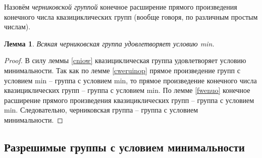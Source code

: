 \documentclass{article}
\newtheorem{lemma}{Лемма}[section]
\begin{document}
Назовём \textit{черниковской группой} конечное расширение прямого произведения конечного числа квазициклических групп (вообще говоря, по различным простым числам).

\begin{lemma}
    Всякая черниковская группа удовлетворяет условию min.
\end{lemma}
\begin{proof}
    В силу леммы \ref{cniow} квазициклическая группа удовлетворяет условию минимальности. Так как по лемме \ref{cweruinop} прямое произведение групп с условием min -- группа с условием min, то прямое произведение конечного числа квазициклических групп -- группа с условием min.
    По лемме \ref{fwenuo} конечное расширение прямого произведения квазициклических групп -- группа с условием min.
    Следовательно, черниковская группа -- группа с условием минимальности.
\end{proof}

\subsection{Разрешимые группы с условием минимальности}
\end{document}
